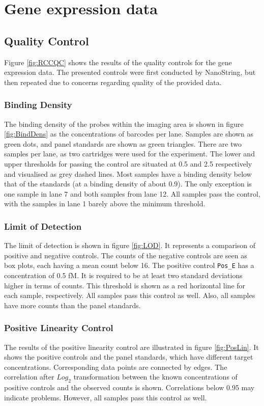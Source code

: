 \clearpage

\section{Gene expression data}

\subsection{Quality Control}

Figure \ref{fig:RCCQC} shows the results of the quality controls for the gene expression data. The presented controls were first conducted by NanoString, but then repeated due to concerns regarding quality of the provided data. 
\subsubsection{Binding Density} The binding density of the probes within the imaging area is shown in figure \ref{fig:BindDens} as the concentrations of barcodes per lane. Samples are shown as green dots, and panel standards are shown as green triangles. There are two samples per lane, as two cartridges were used for the experiment. The lower and upper thresholds for passing the control are situated at 0.5 and 2.5 respectively and visualised as grey dashed lines. Most samples have a binding density below that of the standards (at a binding density of about 0.9). The only exception is one sample in lane 7 and both samples from lane 12. All samples pass the control, with the samples in lane 1 barely above the minimum threshold. \cite{Gorman2022IO, NanoStringTechnologies2017Gene}
\subsubsection{Limit of Detection} The limit of detection is shown in figure \ref{fig:LOD}. It represents a comparison of positive and negative controls. The counts of the negative controls are seen as box plots, each having a mean count below 16. The positive control \verb|Pos_E| has a concentration of 0.5 fM. It is required to be at least two standard deviations higher in terms of counts. This threshold is shown as a red horizontal line for each sample, respectively. All samples pass this control as well. Also, all samples have more counts than the panel standards. \cite{Gorman2022IO, NanoStringTechnologies2017Gene}
\subsubsection{Positive Linearity Control} The results of the positive linearity control are illustrated in figure \ref{fig:PosLin}. It shows the positive controls and the panel standards, which have different target concentrations. Corresponding data points are connected by edges. The correlation after $Log_2$ transformation between the known concentrations of positive controls and the observed counts is shown. Correlations below 0.95 may indicate problems. However, all samples pass this control as well. \cite{Gorman2022IO, NanoStringTechnologies2017Gene}

